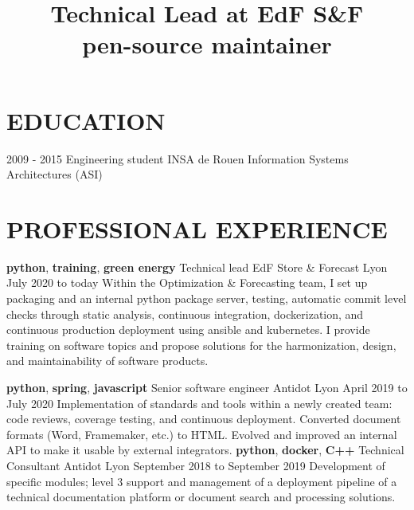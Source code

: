 \documentclass[11pt,a4paper]{moderncv}
\title{
  Technical Lead at EdF S\&F \texorpdfstring{ \\ }
  Open-source maintainer
}
\begin{document}
  \maketitle
  \vspace*{-5mm}

  \section{EDUCATION}\label{sec:education}

  \cventry
    {2009 - 2015}
    {Engineering student}
    {INSA de Rouen}
    {Information Systems Architectures (ASI)}
	{}{}



  \section{PROFESSIONAL EXPERIENCE}
  \label{sec:professional-experience}

  \cventry
    {\textbf{python}, \textbf{training}, \textbf{green energy}}
    {Technical lead}
    {EdF Store \& Forecast}
    {Lyon}
    {July 2020 to today}{
      Within the Optimization \& Forecasting team, I set up packaging and an
      internal python package server, testing, automatic commit level checks
      through static analysis, continuous integration, dockerization, and
      continuous production deployment using ansible and kubernetes. I provide
      training on software topics and propose solutions for the harmonization,
      design, and maintainability of software products.
    }

  \cventry
    {\textbf{python}, \textbf{spring}, \textbf{javascript}}
    {Senior software engineer}
    {Antidot}
    {Lyon}
    {April 2019 to July 2020}{
      Implementation of standards and tools within a newly created team: code reviews,
      coverage testing, and continuous deployment. Converted document formats (Word, Framemaker, etc.) to
      HTML. Evolved and improved an internal API to make it usable by external integrators.
    }
  \cventry
    {\textbf{python}, \textbf{docker}, \textbf{C++}}
    {Technical Consultant}
    {Antidot}
    {Lyon}
    {September 2018 to September 2019}{
        Development of specific modules; level 3 support and management of a deployment pipeline
        of a technical documentation platform or document search and processing solutions.
    }
\end{document}
